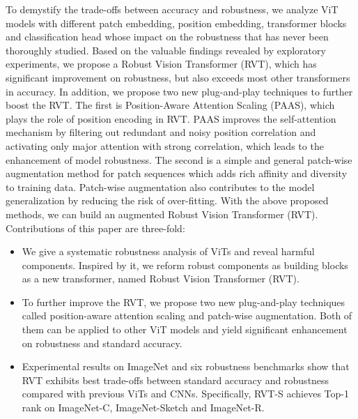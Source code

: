 \documentclass[10pt,twocolumn,letterpaper]{article}
\begin{document}
To demystify the trade-offs between accuracy and robustness, we analyze ViT models with different patch embedding, position embedding, transformer blocks and classification head whose impact on the robustness that has never been thoroughly studied. Based on the valuable findings revealed by exploratory experiments, we propose a Robust Vision Transformer (RVT), which has significant improvement on robustness, but also exceeds most other transformers in accuracy. In addition, we propose two new plug-and-play techniques to further boost the RVT. The first is Position-Aware Attention Scaling (PAAS), which plays the role of position encoding in RVT. PAAS improves the self-attention mechanism by filtering out redundant and noisy position correlation and activating only major attention with strong correlation, which leads to the enhancement of model robustness. The second is a simple and general patch-wise augmentation method for patch sequences which adds rich affinity and diversity to training data. Patch-wise augmentation also contributes to the model generalization by reducing the risk of over-fitting. With the above proposed methods, we can build an augmented Robust Vision Transformer (RVT). Contributions of this paper are three-fold:

\begin{itemize}
\item We give a systematic robustness analysis of ViTs and reveal harmful components. Inspired by it, we reform robust components as building blocks as a new transformer, named Robust Vision Transformer (RVT).

\item To further improve the RVT, we propose two new plug-and-play techniques called position-aware attention scaling and patch-wise augmentation. Both of them can be applied to other ViT models and yield significant enhancement on robustness and standard accuracy.

\item Experimental results on ImageNet and six robustness benchmarks show that RVT exhibits best trade-offs between standard accuracy and robustness compared with previous ViTs and CNNs. Specifically, RVT-S achieves Top-1 rank on ImageNet-C, ImageNet-Sketch and ImageNet-R.
\end{itemize}
\end{document}
